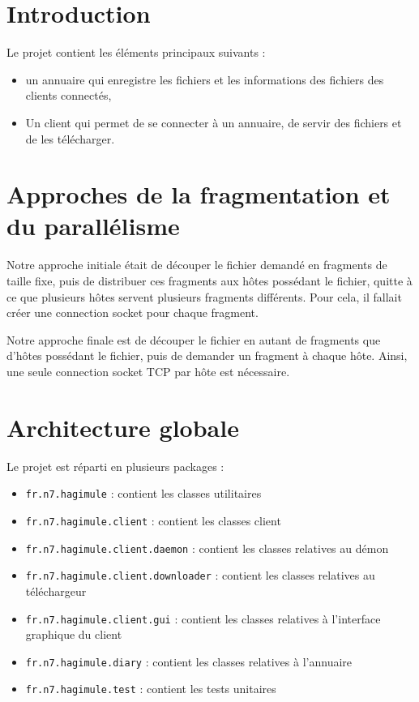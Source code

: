 \documentclass[french]{template}
\begin{document}


\fairemarges
\fairepagedegarde
\tabledematieres
\listedesfigures

\section{Introduction}

Le projet contient les éléments principaux suivants :
\begin{itemize}
    \item un annuaire qui enregistre les fichiers et les informations des fichiers des clients connectés,
    \item Un client qui permet de se connecter à un annuaire, de servir des fichiers et de les télécharger.
\end{itemize}

\section{Approches de la fragmentation et du parallélisme}

Notre approche initiale était de découper le fichier demandé en fragments de taille fixe, puis de distribuer ces fragments aux hôtes possédant le fichier, quitte à ce que plusieurs hôtes servent plusieurs fragments différents. Pour cela, il fallait créer une connection socket pour chaque fragment.

Notre approche finale est de découper le fichier en autant de fragments que d'hôtes possédant le fichier, puis de demander un fragment à chaque hôte. Ainsi, une seule connection socket TCP par hôte est nécessaire.

\section{Architecture globale}

Le projet est réparti en plusieurs packages :

\begin{itemize}
    \item \texttt{fr.n7.hagimule} : contient les classes utilitaires
    \item \texttt{fr.n7.hagimule.client} : contient les classes client
    \item \texttt{fr.n7.hagimule.client.daemon} : contient les classes relatives au démon
    \item \texttt{fr.n7.hagimule.client.downloader} : contient les classes relatives au téléchargeur
    \item \texttt{fr.n7.hagimule.client.gui} : contient les classes relatives à l'interface graphique du client
    \item \texttt{fr.n7.hagimule.diary} : contient les classes relatives à l'annuaire
    \item \texttt{fr.n7.hagimule.test} : contient les tests unitaires
\end{itemize}
\end{document}
